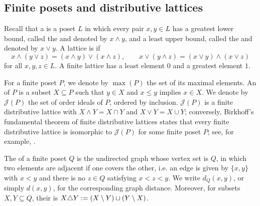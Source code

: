 \documentclass[a4paper,leqno]{amsart}
\begin{document}
\subsection{Finite posets and distributive lattices}

Recall that a  is a poset $L$ in which every pair $x,y\in L$ has a greatest lower bound, called the  and denoted by $x\wedge y$, and a least upper bound, called the  and denoted by $x\vee y$. A lattice is  if
\[
x\wedge(y\vee z)
 =(x\wedge y)\vee(x\wedge z),
\qquad
x\vee(y\wedge z)
 =(x\vee y)\wedge(x\vee z)
\]
for all $x,y,z\in L$. A finite lattice has a least element $0$ and a greatest element $1$.

For a finite poset $P$, we denote by $\max(P)$ the set of its maximal elements. An  of $P$ is a subset $X\subseteq P$ such that $y\in X$ and $x\leq y$ implies $x\in X$. We denote by $\mathcal J(P)$ the set of order ideals of $P$, ordered by inclusion. 
$\mathcal J(P)$ is a finite distributive lattice with $X\wedge Y=X\cap Y$ and $X\vee Y=X\cup Y$; conversely, Birkhoff's fundamental theorem of finite distributive lattices states that every finite distributive lattice is isomorphic to $\mathcal J(P)$ for some finite poset $P$; see, for example, \cite{Gra03}.

The  of a finite poset $Q$ is the undirected graph whose vertex set is $Q$, in which two elements are adjacent if one covers the other, i.e. an edge is given by $\{x,y\}$ with $x<y$ and there is no $z\in Q$ satisfying $x<z<y$. We write $d_Q(x,y)$, or simply $d(x,y)$, for the corresponding graph distance. Moreover, for subsets $X,Y\subseteq Q$, their  is $X{\mathbin{\triangle}} Y:=(X\setminus Y)\sqcup(Y\setminus X)$.
\end{document}
